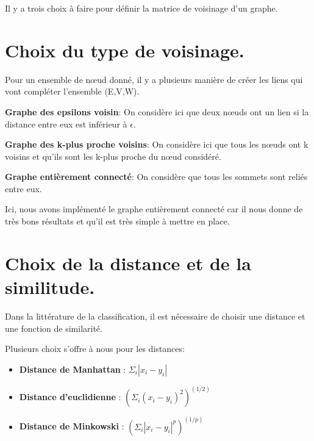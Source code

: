 Il y a trois choix à faire pour définir la matrice de voisinage d'un graphe.

\section{Choix du type de voisinage.}

Pour un ensemble de nœud donné, il y a plusieurs manière de créer les liens qui vont compléter l'ensemble (E,V,W).

\medskip

\textbf{Graphe des epsilons voisin}: On considère ici que deux nœuds ont un lien si la distance entre eux est inférieur à $\epsilon$.

\medskip

\textbf{Graphe des k-plus proche voisins}: On considère ici que tous les nœuds ont k voisins et qu'ils sont les k-plus proche du nœud considéré.

\medskip

\textbf{Graphe entièrement connecté}: On considère que tous les sommets sont reliés entre eux. 

\medskip

Ici, nous avons implémenté le graphe entièrement connecté car il nous donne de très bons résultats et qu'il est très simple à mettre en place.

\section{Choix de la distance et de la similitude.}

Dans la littérature de la classification, il est nécessaire de choisir une distance et une fonction de similarité.

\medskip

Plusieurs choix s'offre à nous pour les distances:

\begin{itemize}

\medskip

\item \textbf{Distance de Manhattan} : $\Sigma_i|x_i-y_i|$

\medskip

\item \textbf{Distance d'euclidienne} : $(\Sigma_i(x_i-y_i)^2)^(1/2)$

\medskip

\item \textbf{Distance de Minkowski} : $(\Sigma_i|x_i-y_i|^p)^(1/p)$

\medskip

\end{itemize}


